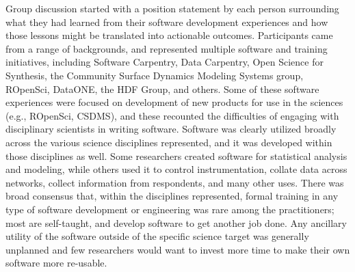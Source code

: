 \documentclass[11pt, oneside]{amsart}
\begin{document}
Group discussion started with a position statement by each person surrounding what they had
learned from their software development experiences and how those lessons might be translated
into actionable outcomes.  Participants came from a range of backgrounds, and represented
multiple software and training initiatives, including Software Carpentry, Data
Carpentry, Open Science for Synthesis, the Community Surface Dynamics Modeling Systems group,
ROpenSci, DataONE, the HDF Group, and others. Some of these software experiences were focused on development
of new products for use in the sciences (e.g., ROpenSci, CSDMS), and these recounted the
difficulties of engaging with disciplinary scientists in writing software.  Software was clearly
utilized broadly across the various science disciplines represented, and it was developed within those
disciplines as well.  Some researchers created software for statistical analysis and modeling, while
others used it to control instrumentation, collate data across networks, collect information from
respondents, and many other uses.  There was broad consensus that, within the disciplines represented,
formal training in any type of software development or engineering was rare among the practitioners;
most are self-taught, and develop software to get another job done. Any ancillary utility of the software
outside of the specific science target was generally unplanned and few researchers would want to invest more
time to make their own software more re-usable.
\end{document}
